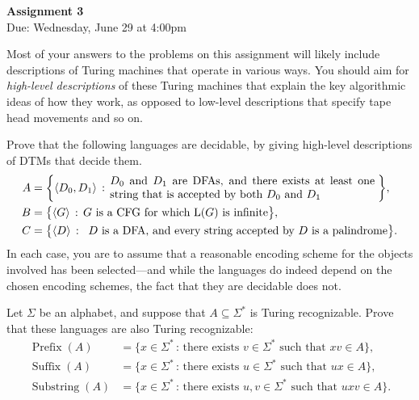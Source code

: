 \documentclass[11pt]{article}
\newcommand{\op}[1]{\operatorname{#1}}
\newenvironment{mylist}[1]{\begin{list}{}{
	\setlength{\leftmargin}{#1}
	\setlength{\rightmargin}{0mm}
	\setlength{\labelsep}{2mm}
	\setlength{\labelwidth}{8mm}
	\setlength{\itemsep}{0mm}}}
	{\end{list}}
\newcounter{questioncounter}
\newenvironment{question}{
  \begin{mylist}{\parindent}
  \item[\stepcounter{questioncounter}
    \thequestioncounter.]}{
\end{mylist}}
\begin{document}
\pagestyle{plain}
\thispagestyle{fancy}
\cfoot{\thepage} 
\renewcommand{\headrulewidth}{0pt}
\renewcommand{\footrulewidth}{0pt}

\begin{center}
  \rule{0mm}{9mm}
  {\Large\bf Assignment 3}\\[2mm]
  Due: Wednesday, June 29 at 4:00pm
\end{center}


Most of your answers to the problems on this assignment will likely include
descriptions of Turing machines that operate in various ways.
You should aim for \emph{high-level descriptions} of these Turing machines
that explain the key algorithmic ideas of how they work, as opposed to
low-level descriptions that specify tape head movements and so on.


\begin{question}[6 points]
  Prove that the following languages are decidable, by giving high-level
  descriptions of DTMs that decide them.
  \begin{align*}
    A & = 
    \biggl\{ \langle D_0,D_1 \rangle \,:\, 
    \parbox{3.25in}{$D_0$ and $D_1$ are DFAs,
      and there exists at least one string that is accepted by both
      $D_0$ and $D_1$}\;\biggr\},\\
    B & =
    \bigl\{\langle G\rangle\,:\,\text{$G$ is a CFG for which $\op{L}(G)$ is
      infinite}\bigr\},\\
    C & = 
    \bigl\{\langle D\rangle\,:\:
    \text{
      $D$ is a DFA, and every string accepted by
      $D$ is a palindrome}\bigr\}.
  \end{align*}
  In each case, you are to assume that a reasonable encoding scheme for the
  objects involved has been selected---and while the languages do indeed
  depend on the chosen encoding schemes, the fact that they are decidable does
  not.
\end{question}


\begin{question}[6 points]
  Let $\Sigma$ be an alphabet, and suppose that $A\subseteq\Sigma^{\ast}$
  is Turing recognizable.
  Prove that these languages are also Turing recognizable:
  \begin{align*}
    \op{Prefix}(A) & = \bigl\{x\in\Sigma^{\ast}\,:\,
    \text{there exists $v\in\Sigma^{\ast}$ such that $xv\in A$}\bigr\},\\
    \op{Suffix}(A) & = \bigl\{x\in\Sigma^{\ast}\,:\,
    \text{there exists $u\in\Sigma^{\ast}$ such that $ux\in A$}\bigr\},\\
    \op{Substring}(A) & = \bigl\{x\in\Sigma^{\ast}\,:\,
    \text{there exists $u,v\in\Sigma^{\ast}$ such that $uxv\in A$}\bigr\}.
  \end{align*}
\end{question}
\end{document}
